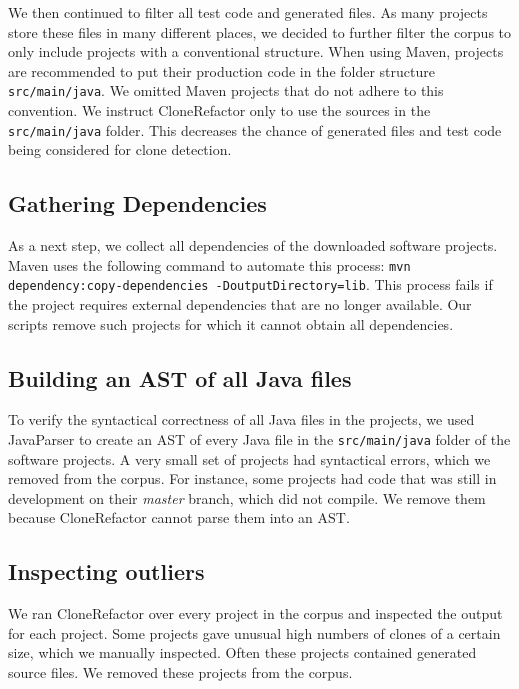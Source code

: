 We then continued to filter all test code and generated files. As many projects store these files in many different places, we decided to further filter the corpus to only include projects with a conventional structure. When using Maven, projects are recommended to put their production code in the folder structure \texttt{src/main/java}. We omitted Maven projects that do not adhere to this convention. We instruct CloneRefactor only to use the sources in the \texttt{src/main/java} folder. This decreases the chance of generated files and test code being considered for clone detection.

\subsection{Gathering Dependencies}
As a next step, we collect all dependencies of the downloaded software projects. Maven uses the following command to automate this process: \texttt{mvn dependency:copy-dependencies -DoutputDirectory=lib}. This process fails if the project requires external dependencies that are no longer available. Our scripts remove such projects for which it cannot obtain all dependencies.

\subsection{Building an AST of all Java files}
To verify the syntactical correctness of all Java files in the projects, we used JavaParser \cite{tomassetti2017javaparser} to create an AST of every Java file in the \texttt{src/main/java} folder of the software projects. A very small set of projects had syntactical errors, which we removed from the corpus. For instance, some projects had code that was still in development on their \textit{master} branch, which did not compile. We remove them because CloneRefactor cannot parse them into an AST.

\subsection{Inspecting outliers}
We ran CloneRefactor over every project in the corpus and inspected the output for each project. Some projects gave unusual high numbers of clones of a certain size, which we manually inspected. Often these projects contained generated source files. We removed these projects from the corpus.

